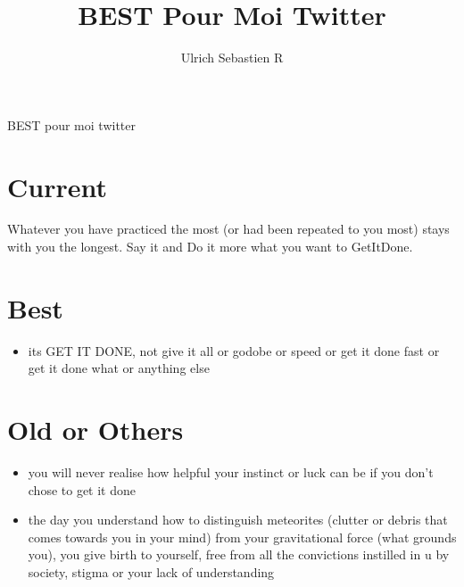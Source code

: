 \documentclass{article}
\author {Ulrich Sebastien R}
\title {\Large{\textbf{BEST Pour Moi Twitter}}}
\begin{document}
\maketitle    

BEST pour moi twitter

\section{Current}
\item Whatever you have practiced the most (or had been repeated to you most) stays with you the longest. Say it and Do it more what you want to GetItDone.

\section{Best}

\begin{itemize}
\item its GET IT DONE, not give it all or godobe or speed or get it done fast or get it done what or anything else

\end{itemize}

\section{Old or Others}
\begin{itemize}
\item you will never realise how helpful your instinct or luck can be if you don't chose to get it done
\item the day you understand how to distinguish meteorites (clutter or debris that comes towards you in your mind) from your gravitational force (what grounds you), you give birth to yourself, free from all the convictions instilled in u by society, stigma or your lack of understanding
\end{itemize}
\end{document}
